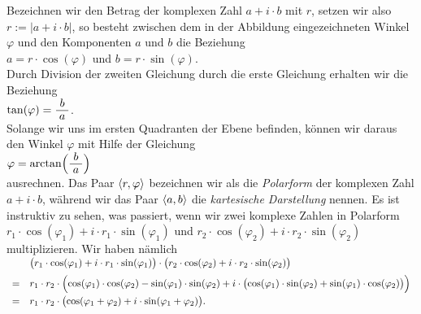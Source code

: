 \vspace*{0.2cm}
\noindent
Bezeichnen wir den Betrag der komplexen Zahl $a + i \cdot b$ mit $r$, setzen wir also 
$r := |a + i \cdot b|$, so besteht zwischen dem in der Abbildung eingezeichneten Winkel $\varphi$
und den Komponenten $a$ und 
$b$ die Beziehung
\\[0.2cm]
\hspace*{1.3cm} $a = r \cdot \cos(\varphi)$ \quad und \quad $b = r \cdot \sin(\varphi)$.
\\[0.2cm]
Durch Division der zweiten Gleichung durch die erste Gleichung erhalten wir die Beziehung
\\[0.2cm]
\hspace*{1.3cm} $\tan(\varphi) = \bruch{b}{a}$.
\\[0.2cm]
Solange wir uns im ersten Quadranten der Ebene befinden, k\"{o}nnen wir daraus den Winkel $\varphi$ mit Hilfe
der Gleichung
\\[0.2cm]
\hspace*{1.3cm} $\varphi = \arctan\Bigl(\bruch{b}{a}\Bigr)$
\\[0.2cm]
ausrechnen.  Das Paar $\pair(r, \varphi)$ bezeichnen wir als die {\emph{\color{blue}Polarform}} der
komplexen Zahl $a + i \cdot b$, w\"{a}hrend wir das Paar $\pair(a,b)$ die {\emph{\color{blue}kartesische Darstellung}}
nennen.  Es ist instruktiv zu sehen, was passiert, wenn wir zwei
komplexe Zahlen in Polarform
\\[0.2cm]
\hspace*{1.3cm} 
$r_1 \cdot \cos(\varphi_1) + i \cdot r_1 \cdot \sin(\varphi_1)$ \quad und \quad
$r_2 \cdot \cos(\varphi_2) + i \cdot r_2 \cdot \sin(\varphi_2)$ 
\\[0.2cm]
multiplizieren.  Wir haben n\"{a}mlich
\\[0.2cm]
$
\begin{array}[t]{cl}
  & \bigl(r_1 \cdot \cos(\varphi_1) + i \cdot r_1 \cdot \sin(\varphi_1)\bigr) \cdot
    \bigl(r_2 \cdot \cos(\varphi_2) + i \cdot r_2 \cdot \sin(\varphi_2)\bigr)       \\[0.2cm]
= & r_1 \cdot r_2 \cdot
    \Bigl(\cos(\varphi_1) \cdot \cos(\varphi_2) - \sin(\varphi_1) \cdot \sin(\varphi_2) +
          i \cdot \bigl(\cos(\varphi_1) \cdot \sin(\varphi_2) + \sin(\varphi_1) \cdot \cos(\varphi_2)\bigr)
    \Bigr) \\[0.2cm]
= & r_1 \cdot r_2 \cdot
    \bigl(\cos(\varphi_1 + \varphi_2) + i \cdot \sin(\varphi_1 + \varphi_2) \bigr).
\end{array}
$
\\[0.2cm]
